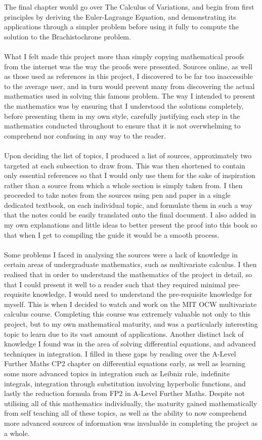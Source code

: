 \documentclass[12pt]{report}
\begin{document}
The final chapter would go over The Calculus of Variations, and begin from first principles by deriving the Euler-Lagrange Equation, and demonstrating its applications through a simpler problem before using it fully to compute the solution to the Brachistochrone problem.
\\
\\
What I felt made this project more than simply copying mathematical proofs from the internet was the way the proofs were presented. Sources online, as well as those used as references in this project, I discovered to be far too inaccessible to the average user, and in turn would prevent many from discovering the actual mathematics used in solving this famous problem. The way I intended to present the mathematics was by ensuring that I understood the solutions completely, before presenting them in my own style, carefully justifying each step in the mathematics conducted throughout to ensure that it is not overwhelming to comprehend nor confusing in any way to the reader.
\\
\\
Upon deciding the list of topics, I produced a list of sources, approximately two targeted at each subsection to draw from. This was then shortened to contain only essential references so that I would only use them for the sake of inspiration rather than a source from which a whole section is simply taken from. I then proceeded to take notes from the sources using pen and paper in a single dedicated textbook, on each individual topic, and formulate them in such a way that the notes could be easily translated onto the final document. I also added in my own explanations and little ideas to better present the proof into this book so that when I get to compiling the guide it would be a smooth process.
\\
\\
Some problems I faced in analysing the sources were a lack of knowledge in certain areas of undergraduate mathematics, such as multivariate calculus. I then realised that in order to understand the mathematics of the project in detail, so that I could present it well to a reader such that they required minimal pre-requisite knowledge, I would need to understand the pre-requisite knowledge for myself. This is when I decided to watch and work on the MIT OCW multivariate calculus course. Completing this course was extremely valuable not only to this project, but to my own mathematical maturity, and was a particularly interesting topic to learn due to its vast amount of applications. Another distinct lack of knowledge I found was in the area of solving differential equations, and advanced techniques in integration. I filled in these gaps by reading over the A-Level Further Maths CP2 chapter on differential equations early, as well as learning some more advanced topics in integration such as Leibniz rule, indefinite integrals, integration through substitution involving hyperbolic functions, and lastly the reduction formula from FP2 in A-Level Further Maths. Despite not utilising all of this mathematics individually, the maturity gained mathematically from self teaching all of these topics, as well as the ability to now comprehend more advanced sources of information was invaluable in completing the project as a whole.
\end{document}
